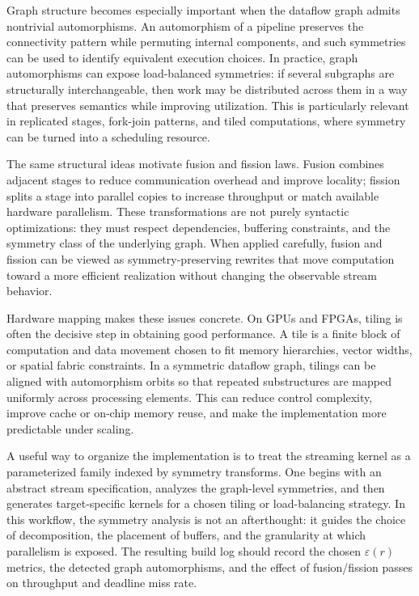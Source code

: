 \documentclass[11pt]{article}
\begin{document}
Graph structure becomes especially important when the dataflow graph admits nontrivial automorphisms. An automorphism of a pipeline preserves the connectivity pattern while permuting internal components, and such symmetries can be used to identify equivalent execution choices. In practice, graph automorphisms can expose load-balanced symmetries: if several subgraphs are structurally interchangeable, then work may be distributed across them in a way that preserves semantics while improving utilization. This is particularly relevant in replicated stages, fork-join patterns, and tiled computations, where symmetry can be turned into a scheduling resource.

The same structural ideas motivate fusion and fission laws. Fusion combines adjacent stages to reduce communication overhead and improve locality; fission splits a stage into parallel copies to increase throughput or match available hardware parallelism. These transformations are not purely syntactic optimizations: they must respect dependencies, buffering constraints, and the symmetry class of the underlying graph. When applied carefully, fusion and fission can be viewed as symmetry-preserving rewrites that move computation toward a more efficient realization without changing the observable stream behavior.

Hardware mapping makes these issues concrete. On GPUs and FPGAs, tiling is often the decisive step in obtaining good performance. A tile is a finite block of computation and data movement chosen to fit memory hierarchies, vector widths, or spatial fabric constraints. In a symmetric dataflow graph, tilings can be aligned with automorphism orbits so that repeated substructures are mapped uniformly across processing elements. This can reduce control complexity, improve cache or on-chip memory reuse, and make the implementation more predictable under scaling.

A useful way to organize the implementation is to treat the streaming kernel as a parameterized family indexed by symmetry transforms. One begins with an abstract stream specification, analyzes the graph-level symmetries, and then generates target-specific kernels for a chosen tiling or load-balancing strategy. In this workflow, the symmetry analysis is not an afterthought: it guides the choice of decomposition, the placement of buffers, and the granularity at which parallelism is exposed. The resulting build log should record the chosen \(\varepsilon(r)\) metrics, the detected graph automorphisms, and the effect of fusion/fission passes on throughput and deadline miss rate.
\end{document}
